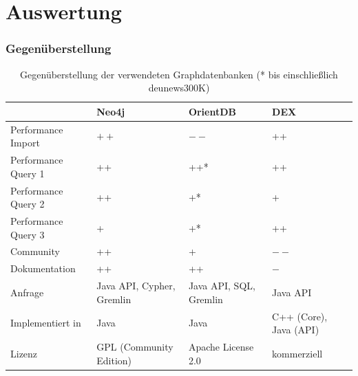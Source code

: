 \documentclass{beamer}
\begin{document}
\section{Auswertung}
\begin{frame}\frametitle{Gegenüberstellung}

	\renewcommand{\arraystretch}{1.5}
	
	\begin{table}[ht]
	\begin{tabular}{|l||p{2.5cm}|p{2.5cm}|p{2.5cm}|}
	\hline 
	 & \textbf{Neo4j} & \textbf{OrientDB} & \textbf{DEX} \\ 
	\hline
	Performance Import & $++$ & $--$ & ++ \\ 
	\hline 
	Performance Query 1 & ++ & ++* & ++ \\ 
	\hline 
	Performance Query 2 & ++ & +* & + \\ 
	\hline 
	Performance Query 3 & + & +* & ++ \\ 
	\hline
	Community & ++ & + & $--$ \\ 
	\hline 
	Dokumentation & ++ & ++ & $-$ \\
	\hline 
	Anfrage & Java API, Cypher, Gremlin & Java API, SQL, Gremlin & Java API \\
	\hline
	Implementiert in & Java & Java & C++ (Core), Java (API) \\
	\hline 
	Lizenz & GPL (Community Edition) & Apache License 2.0 & kommerziell	 \\ 
	\hline 
	\end{tabular}
	\caption{Gegenüberstellung der verwendeten Graphdatenbanken (* bis einschließlich deu\textunderscore news\textunderscore 300K)}
	\label{tab:compare}
	\end{table}
\normalfont
\end{frame}
\end{document}
